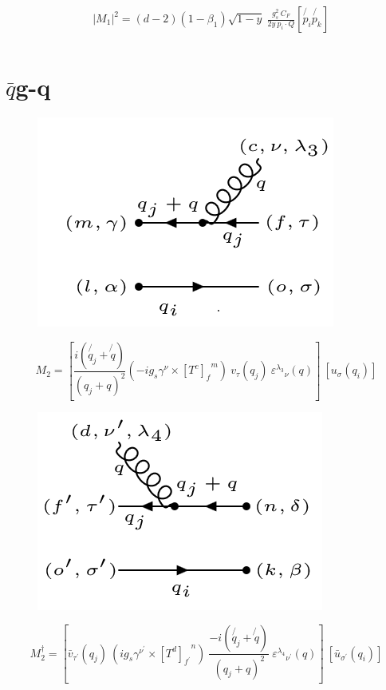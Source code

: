 \begin{equation}
\begin{split}
&|M_1|^2=(d-2)(1-\beta_1)\sqrt{1-y}\:\frac{g_s^2 \: C_F }{2y\: p_i \cdot Q}
[\not{p_i} \not{p_k} ]\\
\end{split}
\end{equation}


\newpage

\section{$\bar{q}$g-q}

\begin{figure}[h!]
\centering
\includegraphics[scale=0.7]{images/qbargqM.png}
\end{figure}

\begin{equation}
M_2 = [\frac{i(\not{q_j} + \not{q})}{(q_j + q)^2} (-ig_s \gamma^{\nu}\times {[T^c]_f}^m) \:{v}_{\tau}(q_j)\: {\varepsilon^{\lambda_3}}_{\nu} (q)]\: [{u}_{\sigma}(q_i)]
\end{equation}
\begin{figure}[h!]
\centering
\includegraphics[scale=0.7]{images/qbargqMDega.png}
\end{figure}
\begin{equation}
M_2^{\dagger} = [\bar{v}_{{\tau}^{\prime}}(q_j) \: (ig_s \gamma^{{\nu}^{\prime}}\times {[T^d]_{f^{\prime}}}^n) \: \frac{-i(\not{q_j} + \not{q})}{(q_j + q)^2} \: {\varepsilon^{\lambda_4}}_{{\nu}^{\prime}} (q)]\: [\bar{u}_{{\sigma}^{\prime}}(q_i)]
\end{equation}

